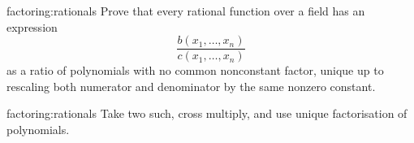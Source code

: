 \begin{problem}{factoring:rationals}
Prove that every rational function over a field has an expression 
\[
\frac{b(x_1,\dots,x_n)}{c(x_1,\dots,x_n)}
\]
as a ratio of polynomials with no common nonconstant factor, unique up to rescaling both numerator and denominator by the same nonzero constant.
\end{problem}
\begin{answer}{factoring:rationals}
Take two such, cross multiply, and use unique factorisation of polynomials.
\end{answer}

